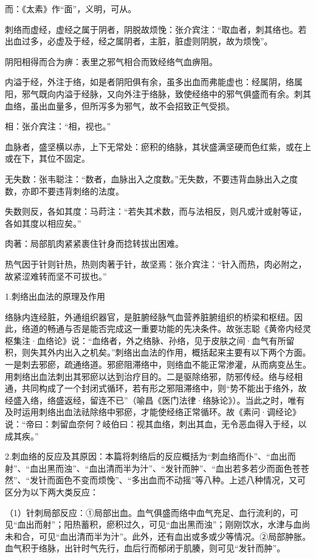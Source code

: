 \documentclass[12pt]{ctexbook}%
\begin{document}
\begin{jiaozhu}
	\item 而：《太素》作“面”，义明，可从。
	\item 刺络而虚经，虚经之属于阴者，阴脱故烦悗：张介宾注：“取血者，刺其络也。若出血过多，必虚及于经，经之属阴者，主脏，脏虚则阴脱，故为烦悗”。
	\item 阴阳相得而合为痹：表里之邪气相合而致经络气血痹阻。
	\item 内溢于经，外注于络，如是者阴阳俱有余，虽多出血而弗能虚也：经属阴，络属阳，邪气既向内溢于经脉，又向外注于络脉，致使经络中的邪气俱盛而有余。刺其血络，虽出血量多，但所泻多为邪气，故不会招致正气受损。
	\item 相：张介宾注：“相，视也。”
	\item 血脉者，盛坚横以赤，上下无常处：瘀积的络脉，其状盛满坚硬而色红紫，或在上或在下，其位不固定。
	\item 无失数：张韦聪注：“数者，血脉出入之度数。”无失数，不要违背血脉出入之度数，亦即不要违背刺络的法度。
	\item 失数则反，各如其度：马莳注：“若失其术数，而与法相反，则凡或汁或射等证，各如其度以相应矣。”
	\item 肉著：局部肌肉紧紧裹住针身而捻转拔出困难。
	\item 热气因于针则针热，热则肉著于针，故坚焉：张介宾注：“针入而热，肉必附之，故紧涩难转而坚不可拔也。”
\end{jiaozhu}


1.刺络出血法的原理及作用

络脉内连经脏，外通组织器官，是脏腑经脉气血营养脏腑组织的桥梁和枢纽。因此，络道的畅通与否是能否完成这一重要功能的先决条件。故张志聪《黄帝内经灵枢集注·血络论》说：“血络者，外之络脉、孙络，见于皮肤之间·血气有所留积，则失其外内出入之机矣。”刺络出血法的作用，概括起来主要有以下两个方面。一是刺去邪瘀，疏通络道。邪瘀阻滞络中，则络血不能正常渗灌，从而病变丛生。用刺络出血法刺出其邪瘀以达到治疗目的。二是驱除络邪，防邪传经。络与经相通，共同构成了一个封闭式循环，若有形之邪阻滞络中，则“势不能出于络外，故经盛入络，络盛返经，留连不已”（喻昌《医门法律·络脉论》）。当此之时，唯有及时运用刺络出血法祛除络中邪瘀，才能使经络正常循环。故《素问·调经论》说：“帝曰：刺留血奈何？岐伯曰：视其血络，刺出其血，无令恶血得入于经，以成其疾。”

2.刺血络的反应及其原因：本篇将刺络后的反应概括为“刺血络而仆”、“血出而射”、“血出黑而浊”、“血出清而半为汁”、“发针而肿”、“血出若多若少而面色苍苍然”、“发针而面色不变而烦悗”、“多出血而不动摇”等八种。上述八种情况，又可区分为以下两大类反应：

（1）针刺局部反应：①局部出血。血气俱盛而络中血气充足、血行流利的，可见“血出而射”；阳热蓄积，瘀积过久，可见“血出黑而浊”；刚刚饮水，水津与血尚未和合，可见“血出清而半为汁”。此外，还有血出或多或少等情况。②局部肿胀。血气积于络脉，出针时气先行，血后行而郁闭于肌腠，则可见“发针而肿”。
\end{document}
